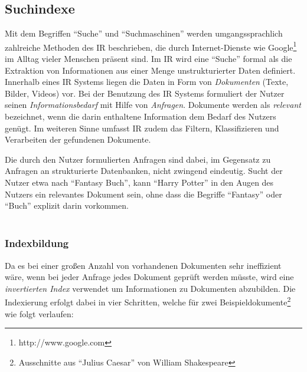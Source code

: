 \subsection{Suchindexe}
\label{sec:search}

Mit dem Begriffen ``Suche'' und ``Suchmaschinen'' werden umgangssprachlich zahlreiche Methoden des  \ac{IR} beschrieben, die durch Internet-Dienste wie Google\footnote{http://www.google.com} im Alltag vieler Menschen präsent sind. Im \acs{IR} wird eine ``Suche'' formal als die Extraktion von Informationen aus einer Menge unstrukturierter Daten definiert. Innerhalb eines \acs{IR} Systems liegen die Daten in Form von \textit{Dokumenten} (Texte, Bilder, Videos) vor. Bei der Benutzung des \acs{IR} Systems formuliert der Nutzer seinen \textit{Informationsbedarf} mit Hilfe von \textit{Anfragen}. Dokumente werden als \textit{relevant} bezeichnet, wenn die darin enthaltene Information dem Bedarf des Nutzers genügt. Im weiteren Sinne umfasst \acs{IR} zudem das Filtern, Klassifizieren und Verarbeiten der gefundenen Dokumente.  \citep{Manning2008}

Die durch den Nutzer formulierten Anfragen sind dabei, im Gegensatz zu Anfragen an strukturierte Datenbanken, nicht zwingend eindeutig. Sucht der Nutzer etwa nach ``Fantasy Buch'', kann ``Harry Potter'' in den Augen des Nutzers ein relevantes Dokument sein, ohne dass die Begriffe ``Fantasy'' oder ``Buch'' explizit darin vorkommen. \\ \\%

\subsubsection{Indexbildung} \label{sec:indexcreation}

Da es bei einer großen Anzahl von vorhandenen Dokumenten sehr ineffizient wäre, wenn bei jeder Anfrage jedes Dokument geprüft werden müsste, wird eine \textit{invertierten Index} verwendet um Informationen zu Dokumenten abzubilden. Die Indexierung erfolgt dabei in vier Schritten, welche für zwei Beispieldokumente\footnote{Ausschnitte aus ``Julius Caesar'' von William Shakespeare} wie folgt verlaufen:

